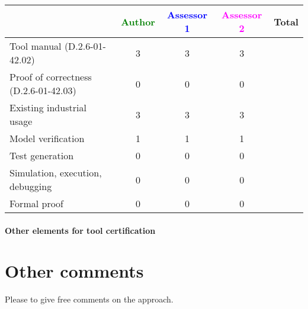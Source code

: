 \begin{tabular}{|l | c | c | c | c|}
\hline
& \textcolor{green}{Author} & \textcolor{blue}{Assessor 1} & \textcolor{magenta}{Assessor 2} & Total \\
\hline 
Tool manual (D.2.6-01-42.02) &3 &3 & 3&  \\
\hline
Proof of correctness (D.2.6-01-42.03)   &0 &0 & 0& \\
\hline
Existing industrial  usage  &3 &3 & 3& \\
\hline
Model verification &1 &1 & 1& \\
\hline
Test generation &0 &0 & 0& \\
\hline
Simulation, execution, debugging &0 &0 & 0& \\
\hline
Formal proof &0 &0 & 0& \\
\hline
\end{tabular}

\paragraph{Other elements for tool certification}

\section{Other comments}
Please to  give free comments on the approach.




